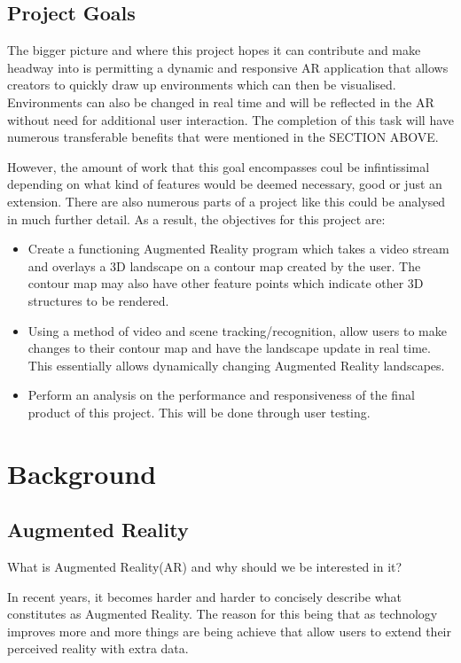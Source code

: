 \documentclass[11pt]{report}
\begin{document}
\subsection*{Project Goals}
The bigger picture and where this project hopes it can contribute and make 
headway into is permitting a dynamic and responsive AR application that allows
creators to quickly draw up environments which can then be visualised. 
Environments can also be changed in real time and will be reflected in the AR
without need for additional user interaction. The completion of this
task will have numerous transferable benefits that were mentioned in the 
SECTION ABOVE. %

However, the amount of work that this goal encompasses coul be infintissimal
depending on what kind of features would be deemed necessary, good or just an
extension. There are also numerous parts of a project like this could be 
analysed in much further detail. As a result, the objectives for this project
are:

\begin{itemize}
	\item Create a functioning Augmented Reality program which takes a
		  video stream and overlays a 3D landscape on a contour map created by
		  the user. The contour map may also have other feature points which 
		  indicate other 3D structures to be rendered.
	\item Using a method of video and scene tracking/recognition, allow users
		  to make changes to their contour map and have the landscape update 
		  in real time. This essentially allows dynamically changing 
		  Augmented Reality landscapes.
	\item Perform an analysis on the performance and responsiveness 
		  of the final product of this project. This will be done
		  through user testing.
		 
\end{itemize}

\newpage
\section*{Background}

\subsection*{Augmented Reality}
\begin{center}
What is Augmented Reality(AR) and why should we be interested in it? \\
\end{center}
In recent years, it becomes harder and harder to concisely describe what
constitutes as Augmented Reality. The reason for this being that as technology
improves more and more things are being achieve that allow users to extend
their perceived reality with extra data.\\ 
\end{document}
